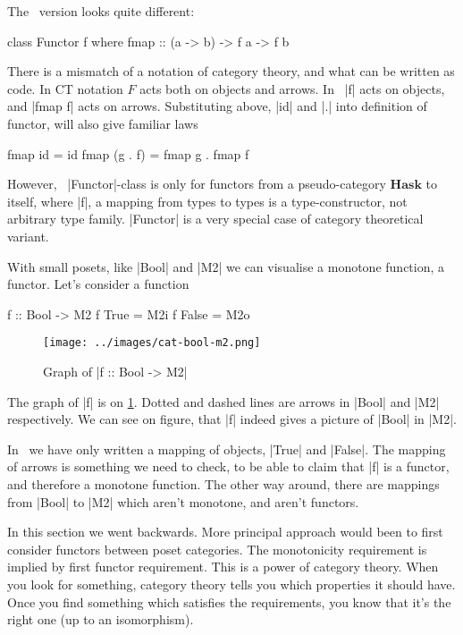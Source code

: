 \documentclass{article}
\begin{document}
The \Haskell\ version looks quite different:
\begin{code}
class Functor f where
  fmap :: (a -> b) -> f a -> f b
\end{code}
There is a mismatch of a notation of category theory, and what
can be written as code. In CT notation $F$ acts both on objects and arrows.
In \Haskell\ |f| acts on objects, and |fmap f| acts on arrows.
Substituting above, |id| and |.| into definition of functor, will
also give familiar laws
\begin{code}
fmap id       = id
fmap (g . f)  = fmap g . fmap f
\end{code}

However, \Haskell\ |Functor|-class is only for functors from a pseudo-category $\mathbf{Hask}$
to itself, where |f|, a mapping from types to types is a type-constructor,
not arbitrary type family.
|Functor| is a very special case of category theoretical variant.

With small posets, like |Bool| and |M2| we can visualise a
monotone function, a functor. Let's consider a function
\begin{code}
f :: Bool -> M2
f True   = M2i
f False  = M2o
\end{code}

\begin{figure}[ht]
\begin{center}
\texttt{[image: ../images/cat-bool-m2.png]}
\end{center}
\caption{Graph of |f :: Bool -> M2|}
\label{fig:f-bool-to-m2}
\end{figure}

The graph of |f| is on \cref{fig:f-bool-to-m2}. Dotted and dashed lines are arrows
in |Bool| and |M2| respectively.
We can see on figure, that |f| indeed gives a picture of |Bool| in |M2|.

In \Haskell\ we have only written
a mapping of objects, |True| and |False|. The mapping of arrows is something
we need to check, to be able to claim that |f| is a functor, and therefore
a monotone function. The other way around, there are mappings from 
|Bool| to |M2| which aren't monotone, and aren't functors.

In this section we went backwards. More principal approach would been to first
consider functors between poset categories. The monotonicity requirement is
implied by first functor requirement. This is a power of category
theory. When you look for something, category theory tells you which
properties it should have. Once you find something which satisfies
the requirements, you know that it's the right one (up to an isomorphism).
\end{document}
